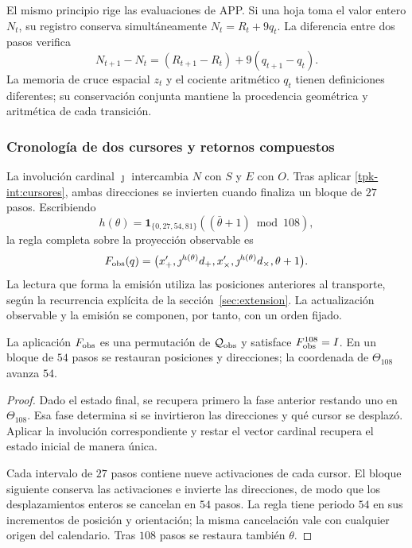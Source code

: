 El mismo principio rige las evaluaciones de APP. Si una hoja toma el
valor entero \(N_t\), su registro conserva simultáneamente
\(N_t=R_t+9q_t\). La diferencia entre dos pasos verifica
\[
 N_{t+1}-N_t=(R_{t+1}-R_t)+9(q_{t+1}-q_t).
\]
La memoria de cruce espacial \(z_t\) y el cociente aritmético \(q_t\)
tienen definiciones diferentes; su conservación conjunta mantiene la
procedencia geométrica y aritmética de cada transición.

\subsubsection{Cronología de dos cursores y retornos compuestos}
\label{tpk-int:cronologia}

La involución cardinal \(\jmath\) intercambia \(N\) con \(S\) y
\(E\) con \(O\). Tras aplicar \eqref{tpk-int:cursores}, ambas
direcciones se invierten cuando finaliza un bloque de \(27\) pasos.
Escribiendo
\[
 h(\theta)=\mathbf1_{\{0,27,54,81\}}
             ((\bar\theta+1)\bmod108),
\]
la regla completa sobre la proyección observable es
\begin{equation}
 F_{\rm obs}(q)=
 \bigl(x_+',\jmath^{h(\theta)}d_+,
       x_\times',\jmath^{h(\theta)}d_\times,
       \theta+1\bigr).
 \label{tpk-int:fobs}
\end{equation}
La lectura que forma la emisión utiliza las posiciones anteriores al
transporte, según la recurrencia explícita de la
sección~\ref{sec:extension}. La actualización observable y la emisión
se componen, por tanto, con un orden fijado.

\begin{proposition}
\label{tpk-int:periodo}
La aplicación \(F_{\rm obs}\) es una permutación de
\(\mathcal Q_{\rm obs}\) y satisface \(F_{\rm obs}^{108}=I\).
En un bloque de \(54\) pasos se restauran posiciones y direcciones;
la coordenada de \(\Theta_{108}\) avanza \(54\).
\end{proposition}
\begin{proof}
Dado el estado final, se recupera primero la fase anterior restando uno
en \(\Theta_{108}\). Esa fase determina si se invirtieron las
direcciones y qué cursor se desplazó. Aplicar la involución correspondiente
y restar el vector cardinal recupera el estado inicial de manera única.

Cada intervalo de \(27\) pasos contiene nueve activaciones de cada
cursor. El bloque siguiente conserva las activaciones e invierte las
direcciones, de modo que los desplazamientos enteros se cancelan en
\(54\) pasos. La regla tiene periodo \(54\) en sus incrementos de
posición y orientación; la misma cancelación vale con cualquier origen
del calendario. Tras \(108\) pasos se restaura también \(\theta\).
\end{proof}

